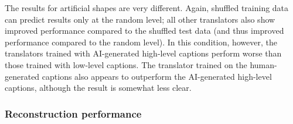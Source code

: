 The results for artificial shapes are very different. Again, shuffled training data can predict results only at the random level; all other translators also show improved performance compared to the shuffled test data (and thus improved performance compared to the random level). In this condition, however, the translators trained with AI-generated high-level captions perform worse than those trained with low-level captions. The translator trained on the human-generated captions also appears to outperform the AI-generated high-level captions, although the result is somewhat less clear. 

\subsubsection{Reconstruction performance}

